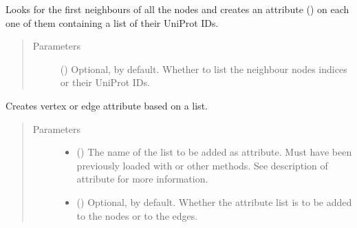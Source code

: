 \documentclass[letterpaper,10pt,english]{sphinxmanual}
\begin{document}
\begin{fulllineitems}
\begin{fulllineitems}
\end{fulllineitems}


\begin{fulllineitems}
\label{\detokenize{main:pypath.main.PyPath.all_neighbours}}
Looks for the first neighbours of all the nodes and creates an
attribute () on each one of them containing a
list of their UniProt IDs.
\begin{quote}\begin{description}
\item[{Parameters}] \leavevmode
{} () \textendash{} Optional,  by default. Whether to list the
neighbour nodes indices or their UniProt IDs.

\end{description}\end{quote}

\end{fulllineitems}


\begin{fulllineitems}
\label{\detokenize{main:pypath.main.PyPath.apply_list}}
Creates vertex or edge attribute based on a list.
\begin{quote}\begin{description}
\item[{Parameters}] \leavevmode\begin{itemize}
\item {} 
 () \textendash{} The name of the list to be added as attribute. Must have
been previously loaded with
{\hyperref[\detokenize{main:pypath.main.PyPath.load_list}]{}} or other methods.
See description of 
attribute for more information.

\item {} 
 () \textendash{} Optional,  by default. Whether the attribute list
is to be added to the nodes or to the edges.


\end{itemize}
\end{description}
\end{quote}
\end{fulllineitems}
\end{fulllineitems}
\end{document}
